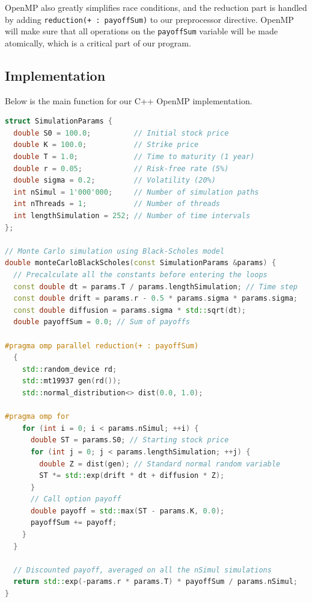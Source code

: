 \documentclass[12pt,a4paper]{report}
\begin{document}
OpenMP also greatly simplifies race conditions, and the reduction part is handled by adding {\tt reduction(+ : payoffSum)} to our preprocessor directive. OpenMP will make sure that all operations on the {\tt payoffSum} variable will be made atomically, which is a critical part of our program.


\subsection{Implementation}
Below is the main function for our C++ OpenMP implementation.
\begin{tcolorbox}[colback=blue!5!white, colframe=blue!50!black, title=Cuda compute simulation]
\begin{lstlisting}[language=C++, breaklines=true, basicstyle=\small]
struct SimulationParams {
  double S0 = 100.0;          // Initial stock price
  double K = 100.0;           // Strike price
  double T = 1.0;             // Time to maturity (1 year)
  double r = 0.05;            // Risk-free rate (5%)
  double sigma = 0.2;         // Volatility (20%)
  int nSimul = 1'000'000;     // Number of simulation paths
  int nThreads = 1;           // Number of threads
  int lengthSimulation = 252; // Number of time intervals
};

// Monte Carlo simulation using Black-Scholes model
double monteCarloBlackScholes(const SimulationParams &params) {
  // Precalculate all the constants before entering the loops
  const double dt = params.T / params.lengthSimulation; // Time step
  const double drift = params.r - 0.5 * params.sigma * params.sigma;
  const double diffusion = params.sigma * std::sqrt(dt);
  double payoffSum = 0.0; // Sum of payoffs

#pragma omp parallel reduction(+ : payoffSum)
  {
    std::random_device rd;
    std::mt19937 gen(rd());
    std::normal_distribution<> dist(0.0, 1.0);

#pragma omp for
    for (int i = 0; i < params.nSimul; ++i) {
      double ST = params.S0; // Starting stock price
      for (int j = 0; j < params.lengthSimulation; ++j) {
        double Z = dist(gen); // Standard normal random variable
        ST *= std::exp(drift * dt + diffusion * Z);
      }
      // Call option payoff
      double payoff = std::max(ST - params.K, 0.0);
      payoffSum += payoff;
    }
  }

  // Discounted payoff, averaged on all the nSimul simulations
  return std::exp(-params.r * params.T) * payoffSum / params.nSimul;
}

\end{lstlisting}
\end{tcolorbox}
\end{document}
